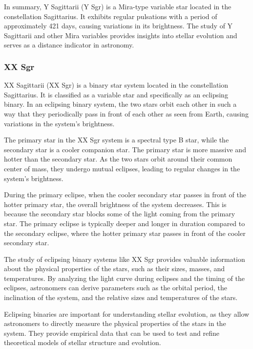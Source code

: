 In summary, Y Sagittarii (Y Sgr) is a Mira-type variable star located in the constellation Sagittarius. It exhibits regular pulsations with a period of approximately 421 days, causing variations in its brightness. The study of Y Sagittarii and other Mira variables provides insights into stellar evolution and serves as a distance indicator in astronomy.



\subsubsection*{ XX Sgr }
XX Sagittarii (XX Sgr) is a binary star system located in the constellation Sagittarius. It is classified as a variable star and specifically as an eclipsing binary. In an eclipsing binary system, the two stars orbit each other in such a way that they periodically pass in front of each other as seen from Earth, causing variations in the system's brightness.

The primary star in the XX Sgr system is a spectral type B star, while the secondary star is a cooler companion star. The primary star is more massive and hotter than the secondary star. As the two stars orbit around their common center of mass, they undergo mutual eclipses, leading to regular changes in the system's brightness.

During the primary eclipse, when the cooler secondary star passes in front of the hotter primary star, the overall brightness of the system decreases. This is because the secondary star blocks some of the light coming from the primary star. The primary eclipse is typically deeper and longer in duration compared to the secondary eclipse, where the hotter primary star passes in front of the cooler secondary star.

The study of eclipsing binary systems like XX Sgr provides valuable information about the physical properties of the stars, such as their sizes, masses, and temperatures. By analyzing the light curve during eclipses and the timing of the eclipses, astronomers can derive parameters such as the orbital period, the inclination of the system, and the relative sizes and temperatures of the stars.

Eclipsing binaries are important for understanding stellar evolution, as they allow astronomers to directly measure the physical properties of the stars in the system. They provide empirical data that can be used to test and refine theoretical models of stellar structure and evolution.

